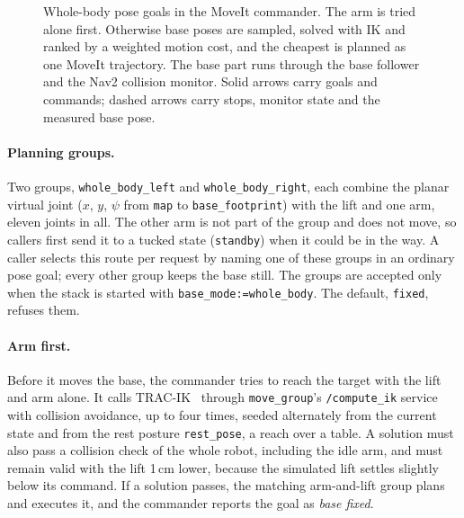 \documentclass[12pt,a4paper]{article}
\begin{document}
\begin{figure}[H]
    \caption{\small{Whole-body pose goals in the MoveIt commander. The arm is tried alone first. Otherwise
    base poses are sampled, solved with IK and ranked by a weighted motion cost, and the cheapest is
    planned as one MoveIt trajectory. The base part runs through the base follower and the Nav2 collision
    monitor. Solid arrows carry goals and commands; dashed arrows carry stops, monitor state and the
    measured base pose.}}
    \label{fig:commander_pipeline}
\end{figure}

\paragraph{Planning groups.}
Two groups, \texttt{whole\_body\_left} and \texttt{whole\_body\_right}, each combine the planar virtual
joint ($x$, $y$, $\psi$ from \texttt{map} to \texttt{base\_footprint}) with the lift and one arm, eleven
joints in all. The other arm is not part of the group and does not move, so callers first send it to a
tucked state (\texttt{standby}) when it could be in the way. A caller selects this route per request by
naming one of these groups in an ordinary pose goal; every other group keeps the base still. The groups
are accepted only when the stack is started with \texttt{base\_mode:=whole\_body}. The default,
\texttt{fixed}, refuses them.

\paragraph{Arm first.}
Before it moves the base, the commander tries to reach the target with the lift and arm alone. It calls
TRAC-IK~\cite{tracik} through \texttt{move\_group}'s \texttt{/compute\_ik} service with collision
avoidance, up to four times, seeded alternately from the current state and from the rest posture
\texttt{rest\_pose}, a reach over a table. A solution must also pass a collision check of the whole
robot, including the idle arm, and must remain valid with the lift 1\,cm lower, because the simulated
lift settles slightly below its command. If a solution passes, the matching arm-and-lift group plans and
executes it, and the commander reports the goal as \emph{base fixed}.
\end{document}
